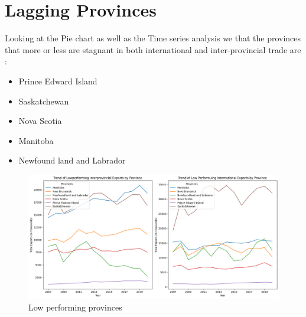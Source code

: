 \documentclass[12pt]{article}
\begin{document}
\section*{Lagging  Provinces}{
Looking at the Pie chart as well as the Time series analysis we that the provinces that more or less are stagnant in both international and inter-provincial trade are : 
\begin{itemize}
    \item Prince Edward Island
    \item Saskatchewan 
    \item Nova Scotia 
    \item Manitoba 
    \item Newfound land and Labrador 
\end{itemize}
\begin{figure}
    \centering
    \includegraphics[width=1\linewidth]{image.png}
    \caption{Low performing provinces}
\end{figure}

}
\newpage
\end{document}
